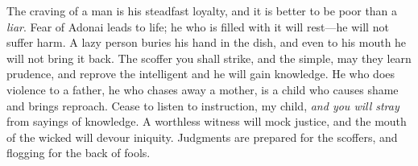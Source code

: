 \begin{biblechapter}
\verse The craving of a man is his steadfast loyalty, 
and it is better to be poor than a \textit{liar}.
\verse Fear of Adonai leads to life; 
he who is filled with it will rest—he will not suffer harm.
\verse A lazy person buries his hand in the dish, 
and even to his mouth he will not bring it back.
\verse The scoffer you shall strike, and the simple, may they learn prudence, 
and reprove the intelligent and he will gain knowledge.
\verse He who does violence to a father, he who chases away a mother, 
is a child who causes shame and brings reproach.
\verse Cease to listen to instruction, my child, 
\textit{and you will stray} from sayings of knowledge.
\verse A worthless witness will mock justice, 
and the mouth of the wicked will devour iniquity.
\verse Judgments are prepared for the scoffers, 
and flogging for the back of fools.
\end{biblechapter}

